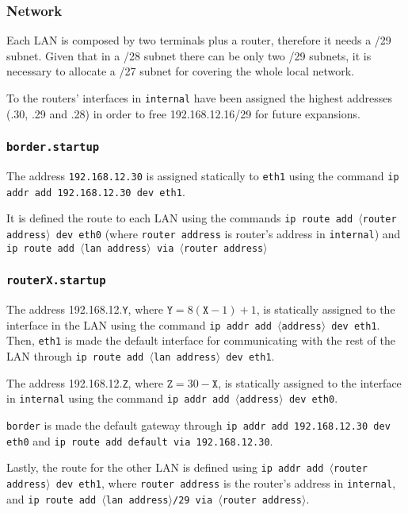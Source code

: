 \documentclass{homework}
\newcommand{\mt}{\texttt}
\begin{document}
    \subsubsection{Network}
    Each LAN is composed by two terminals plus a router, therefore it needs a /29 subnet. Given that in a /28 subnet there can be only two /29 subnets, it is necessary to allocate a /27 subnet for covering the whole local network.
    
    To the routers' interfaces in \mt{internal} have been assigned the highest addresses (.30, .29 and .28) in order to free 192.168.12.16/29 for future expansions.
    
    \subsubsection{\mt{border.startup}}
    The address \mt{192.168.12.30} is assigned statically to \mt{eth1} using the command \mt{ip addr add 192.168.12.30 dev eth1}.
    
    It is defined the route to each LAN using the commands \mt{ip route add $\langle$router address$\rangle$ dev eth0} (where \mt{router address} is router's address in \mt{internal}) and \mt{ip route add $\langle$lan address$\rangle$ via $\langle$router address$\rangle$}
    
    \subsubsection{\mt{routerX.startup}}
    The address 192.168.12.\mt{Y}, where $\mt{Y} = 8(\mt{X} - 1) + 1$, is statically assigned to the interface in the LAN using the command \mt{ip addr add $\langle$address$\rangle$ dev eth1}. Then, \mt{eth1} is made the default interface for communicating with the rest of the LAN through \mt{ip route add $\langle$lan address$\rangle$ dev eth1}.
    
    The address 192.168.12.\mt{Z}, where $\mathtt{Z} = 30 - \mathtt{X}$, is statically assigned to the interface in \mt{internal} using the command 
    \mt{ip addr add $\langle$address$\rangle$ dev eth0}.
    
    \mt{border} is made the default gateway through \mt{ip addr add 192.168.12.30 dev eth0} and \mt{ip route add default via 192.168.12.30}.
    
    Lastly, the route for the other LAN is defined using \mt{ip addr add $\langle$router address$\rangle$ dev eth1}, where \mt{router address} is the router's address in \mt{internal}, and \mt{ip route add $\langle$lan address$\rangle$/29 via $\langle$router address$\rangle$}.
    
\end{document}
